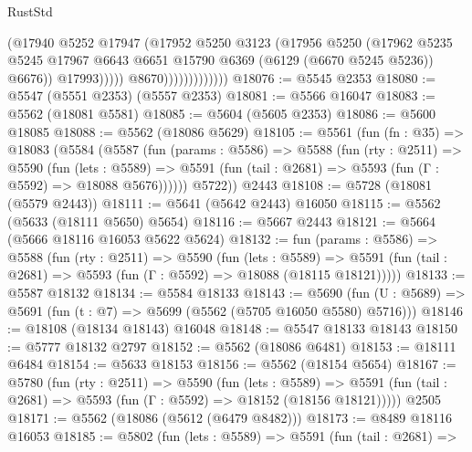 \begin{lexlean}{RustStd}
\begin{coremodule}
                                    (@17940
                                      @5252
                                      @17947
                                      (@17952
                                        @5250
                                        @3123
                                        (@17956
                                          @5250
                                          (@17962
                                            @5235
                                            @5245
                                            @17967
                                            @6643
                                            @6651
                                            @15790
                                            @6369
                                            (@6129 (@6670 @5245 @5236))
                                            @6676))
                                        @17993)))))
                              @8670)))))))))))))
@18076 := @5545 @2353
@18080 := @5547 (@5551 @2353) (@5557 @2353)
@18081 := @5566 @16047
@18083 := @5562 (@18081 @5581)
@18085 := @5604 (@5605 @2353)
@18086 := @5600 @18085
@18088 := @5562 (@18086 @5629)
@18105 := @5561
    (fun (fn : @35) =>
    @18083
      (@5584
        (@5587
          (fun (params : @5586) =>
          @5588
            (fun (rty : @2511) =>
            @5590
              (fun (lets : @5589) =>
              @5591 (fun (tail : @2681) => @5593 (fun (Γ : @5592) => @18088 @5676))))))
        @5722))
    @2443
@18108 := @5728 (@18081 (@5579 @2443))
@18111 := @5641 (@5642 @2443) @16050
@18115 := @5562 (@5633 (@18111 @5650) @5654)
@18116 := @5667 @2443
@18121 := @5664 (@5666 @18116 @16053 @5622 @5624)
@18132 := fun (params : @5586) =>
  @5588
    (fun (rty : @2511) =>
    @5590
      (fun (lets : @5589) =>
      @5591 (fun (tail : @2681) => @5593 (fun (Γ : @5592) => @18088 (@18115 @18121)))))
@18133 := @5587 @18132
@18134 := @5584 @18133
@18143 := @5690
    (fun (U : @5689) => @5691 (fun (t : @7) => @5699 (@5562 (@5705 @16050 @5580) @5716)))
@18146 := @18108 (@18134 @18143) @16048
@18148 := @5547 @18133 @18143
@18150 := @5777 @18132 @2797
@18152 := @5562 (@18086 @6481)
@18153 := @18111 @6484
@18154 := @5633 @18153
@18156 := @5562 (@18154 @5654)
@18167 := @5780
    (fun (rty : @2511) =>
    @5590
      (fun (lets : @5589) =>
      @5591 (fun (tail : @2681) => @5593 (fun (Γ : @5592) => @18152 (@18156 @18121)))))
    @2505
@18171 := @5562 (@18086 (@5612 (@6479 @8482)))
@18173 := @8489 @18116 @16053
@18185 := @5802
    (fun (lets : @5589) =>
    @5591
      (fun (tail : @2681) =>

\end{coremodule}
\end{lexlean}
